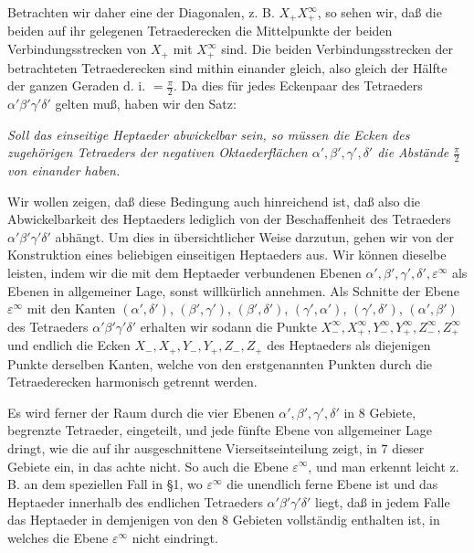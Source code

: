\documentclass[11pt,a4paper]{article}
\begin{document}
Betrachten wir daher eine der Diagonalen, z. B. $X_+X_+^\infty$, so sehen wir, da\ss{} die beiden auf ihr gelegenen Tetraederecken die Mittelpunkte der beiden Verbindungsstrecken von $X_+$ mit $X_+^\infty$ sind. Die beiden Verbindungsstrecken der betrachteten Tetraederecken sind mithin einander gleich, also gleich der H\"alfte der ganzen Geraden d. i. $=\frac{\pi}{2}$. Da dies f\"ur jedes Eckenpaar des Tetraeders $\alpha'\beta'\gamma'\delta'$ gelten mu\ss{}, haben wir den Satz:

\emph{Soll das einseitige Heptaeder abwickelbar sein, so m\"ussen die Ecken des zugeh\"origen Tetraeders der negativen Oktaederfl\"achen $\alpha',\beta',\gamma',\delta'$ die Abst\"ande $\frac{\pi}{2}$ von einander haben.}

Wir wollen zeigen, da\ss{} diese Bedingung auch hinreichend ist, da\ss{} also die Abwickelbarkeit des Heptaeders lediglich von der Beschaffenheit des Tetraeders $\alpha'\beta'\gamma'\delta'$ abh\"angt. Um dies in \"ubersichtlicher Weise darzutun, gehen wir von der Konstruktion eines beliebigen einseitigen Heptaeders aus. Wir k\"onnen dieselbe leisten, indem wir die mit dem Heptaeder verbundenen Ebenen $\alpha',\beta',\gamma',\delta',\varepsilon^\infty$ als Ebenen in allgemeiner Lage, sonst willk\"urlich annehmen. Als Schnitte der Ebene $\varepsilon^\infty$ mit den Kanten $(\alpha',\delta')$, $(\beta',\gamma')$, $(\beta',\delta')$, $(\gamma',\alpha')$, $(\gamma',\delta')$, $(\alpha',\beta')$ des Tetraeders $\alpha'\beta'\gamma'\delta'$ erhalten wir sodann die Punkte $X_-^\infty,X_+^\infty,Y_-^\infty,Y_+^\infty,Z_-^\infty,Z_+^\infty$ und endlich die Ecken $X_-,X_+,Y_-,Y_+,Z_-,Z_+$ des Heptaeders als diejenigen Punkte derselben Kanten, welche von den erstgenannten Punkten durch die Tetraederecken harmonisch getrennt werden.

Es wird ferner der Raum durch die vier Ebenen $\alpha',\beta',\gamma',\delta'$ in $8$ Gebiete, begrenzte Tetraeder, eingeteilt, und jede f\"unfte Ebene von allgemeiner Lage dringt, wie die auf ihr ausgeschnittene Vierseitseinteilung zeigt, in $7$ dieser Gebiete ein, in das achte nicht. So auch die Ebene $\varepsilon^\infty$, und man erkennt leicht z. B. an dem speziellen Fall in \S 1, wo $\varepsilon^\infty$ die unendlich ferne Ebene ist und das Heptaeder innerhalb des endlichen Tetraeders $\alpha'\beta'\gamma'\delta'$ liegt, da\ss{} in jedem Falle das Heptaeder in demjenigen von den $8$ Gebieten vollst\"andig enthalten ist, in welches die Ebene $\varepsilon^\infty$ nicht eindringt.
\end{document}
